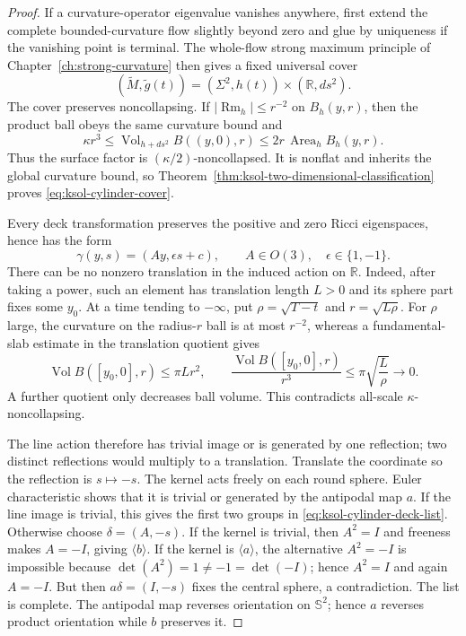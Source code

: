 \documentclass[10pt]{coll-l}
\newcommand{\R}{\mathbb{R}}
\newcommand{\Sph}{\mathbb{S}}
\theoremstyle{definition}
\theoremstyle{remark}
\numberwithin{section}{chapter}
\numberwithin{equation}{chapter}
\newcommand{\Rm}{\operatorname{Rm}}
\newcommand{\Vol}{\operatorname{Vol}}
\begin{document}
\begin{proof}
If a curvature-operator eigenvalue vanishes anywhere, first extend the
complete bounded-curvature flow slightly beyond zero and glue by
uniqueness if the vanishing point is terminal.  The whole-flow strong
maximum principle of Chapter~\ref{ch:strong-curvature} then gives a fixed
universal cover
\[
             (\widetilde M,\widetilde g(t))
             =(\Sigma^2,h(t))\times(\R,ds^2).
\]
The cover preserves noncollapsing.  If $|\Rm_h|\leq r^{-2}$ on
$B_h(y,r)$, then the product ball obeys the same curvature bound and
\[
 \kappa r^3
 \leq\Vol_{h+ds^2}B((y,0),r)
 \leq2r\,\operatorname{Area}_hB_h(y,r).
\]
Thus the surface factor is $(\kappa/2)$-noncollapsed.  It is nonflat and
inherits the global curvature bound, so
Theorem~\ref{thm:ksol-two-dimensional-classification} proves
\eqref{eq:ksol-cylinder-cover}.

Every deck transformation preserves the positive and zero Ricci
eigenspaces, hence has the form
\begin{equation}
                      \gamma(y,s)=(Ay,\epsilon s+c),
       \qquad A\in O(3),\quad\epsilon\in\{1,-1\}.       \label{eq:ksol-deck-product-form}
\end{equation}
There can be no nonzero translation in the induced action on $\R$.  Indeed,
after taking a power, such an element has translation length $L>0$ and its
sphere part fixes some $y_0$.  At a time tending to $-\infty$, put
$\rho=\sqrt{T-t}$ and $r=\sqrt{L\rho}$.  For $\rho$ large, the curvature on
the radius-$r$ ball is at most $r^{-2}$, whereas a fundamental-slab estimate
in the translation quotient gives
\begin{equation}
       \Vol B([y_0,0],r)\leq \pi Lr^2,
       \qquad \frac{\Vol B([y_0,0],r)}{r^3}
                    \leq\pi\sqrt{\frac L\rho}\longrightarrow0.             \label{eq:ksol-translation-collapse}
\end{equation}
A further quotient only decreases ball volume.  This contradicts
all-scale $\kappa$-noncollapsing.

The line action therefore has trivial image or is generated by one
reflection; two distinct reflections would multiply to a translation.
Translate the coordinate so the reflection is $s\mapsto-s$.  The kernel
acts freely on each round sphere.  Euler characteristic shows that it is
trivial or generated by the antipodal map $a$.  If the line image is
trivial, this gives the first two groups in
\eqref{eq:ksol-cylinder-deck-list}.  Otherwise choose
$\delta=(A,-s)$.  If the kernel is trivial, then $A^2=I$ and freeness makes
$A=-I$, giving $\langle b\rangle$.  If the kernel is $\langle a\rangle$,
the alternative $A^2=-I$ is impossible because
$\det(A^2)=1\neq-1=\det(-I)$; hence $A^2=I$ and again $A=-I$.  But then
$a\delta=(I,-s)$ fixes the central sphere, a contradiction.  The list is
complete.  The antipodal map reverses orientation on $\Sph^2$; hence $a$
reverses product orientation while $b$ preserves it.
\end{proof}
\end{document}
